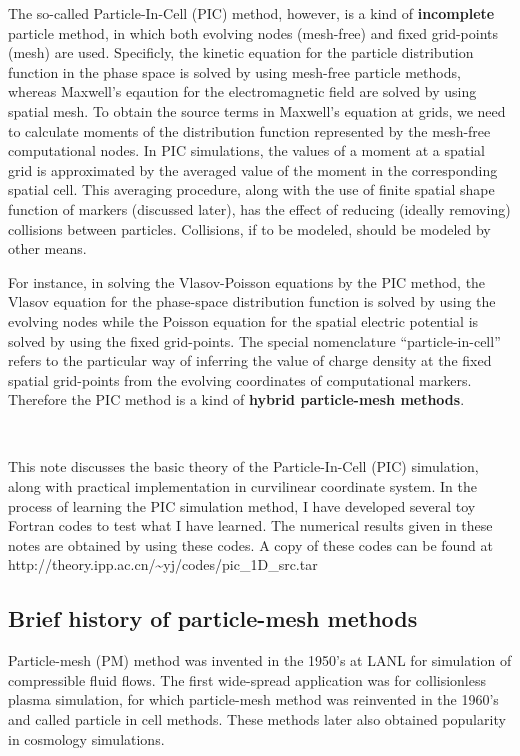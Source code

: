 \documentclass{article}
\newcommand{\tmstrong}[1]{\textbf{#1}}
\begin{document}
The so-called Particle-In-Cell (PIC) method, however, is a kind of
{\tmstrong{incomplete}} particle method, in which both evolving nodes
(mesh-free) and fixed grid-points (mesh) are used. Specificly, the kinetic
equation for the particle distribution function in the phase space is solved
by using mesh-free particle methods, whereas Maxwell's eqaution for the
electromagnetic field are solved by using spatial mesh. To obtain the source
terms in Maxwell's equation at grids, we need to calculate moments of the
distribution function represented by the mesh-free computational nodes. In PIC
simulations, the values of a moment at a spatial grid is approximated by the
averaged value of the moment in the corresponding spatial cell. This averaging
procedure, along with the use of finite spatial shape function of markers
(discussed later), has the effect of reducing (ideally removing) collisions
between particles. Collisions, if to be modeled, should be modeled by other
means.

For instance, in solving the Vlasov-Poisson equations by the PIC method, the
Vlasov equation for the phase-space distribution function is solved by using
the evolving nodes while the Poisson equation for the spatial electric
potential is solved by using the fixed grid-points. The special nomenclature
``particle-in-cell'' refers to the particular way of inferring the value of
charge density at the fixed spatial grid-points from the evolving coordinates
of computational markers. Therefore the PIC method is a kind of
{\tmstrong{hybrid particle-mesh methods}}.

\

This note discusses the basic theory of the Particle-In-Cell (PIC)
simulation, along with practical implementation in curvilinear coordinate
system. In the process of learning the PIC simulation method, I have developed
several toy Fortran codes to test what I have learned. The numerical results
given in these notes are obtained by using these codes. A copy of these codes
can be found at http://theory.ipp.ac.cn/\~{}yj/codes/pic\_1D\_src.tar

\subsection{Brief history of particle-mesh methods}

Particle-mesh (PM) method was invented in the 1950's at LANL for simulation of
compressible fluid flows. The first wide-spread application was for
collisionless plasma simulation, for which particle-mesh method was reinvented
in the 1960's and called particle in cell methods. These methods later also
obtained popularity in cosmology simulations.
\end{document}
